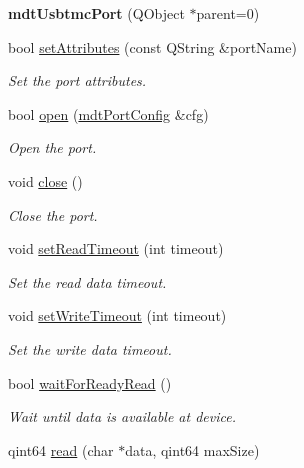 \begin{DoxyCompactItemize}
\item 
\hypertarget{classmdt_usbtmc_port_a102a2d5ebad4968621812e682d9d1b71}{
{\bfseries mdtUsbtmcPort} (QObject $\ast$parent=0)}
\label{classmdt_usbtmc_port_a102a2d5ebad4968621812e682d9d1b71}

\item 
bool \hyperlink{classmdt_usbtmc_port_a00e7406b88f60c6c233e124d08a900ab}{setAttributes} (const QString \&portName)
\begin{DoxyCompactList}\small\item\em Set the port attributes. \end{DoxyCompactList}\item 
bool \hyperlink{classmdt_usbtmc_port_acf677164611ea563e40be93e1b36236a}{open} (\hyperlink{classmdt_port_config}{mdtPortConfig} \&cfg)
\begin{DoxyCompactList}\small\item\em Open the port. \end{DoxyCompactList}\item 
void \hyperlink{classmdt_usbtmc_port_a6fec5e49a42e6c2e6202a8b2f7f0dc37}{close} ()
\begin{DoxyCompactList}\small\item\em Close the port. \end{DoxyCompactList}\item 
void \hyperlink{classmdt_usbtmc_port_ad3ec37dab7918fad36190b1c4c58c266}{setReadTimeout} (int timeout)
\begin{DoxyCompactList}\small\item\em Set the read data timeout. \end{DoxyCompactList}\item 
void \hyperlink{classmdt_usbtmc_port_a18ff8b76d07cd75339204f9389e1dd5c}{setWriteTimeout} (int timeout)
\begin{DoxyCompactList}\small\item\em Set the write data timeout. \end{DoxyCompactList}\item 
bool \hyperlink{classmdt_usbtmc_port_a46efba4f2d3dbb3c917368323de0333b}{waitForReadyRead} ()
\begin{DoxyCompactList}\small\item\em Wait until data is available at device. \end{DoxyCompactList}\item 
qint64 \hyperlink{classmdt_usbtmc_port_a91f45336ca9a71284e0309182f5e8ca1}{read} (char $\ast$data, qint64 maxSize)

\end{DoxyCompactItemize}

